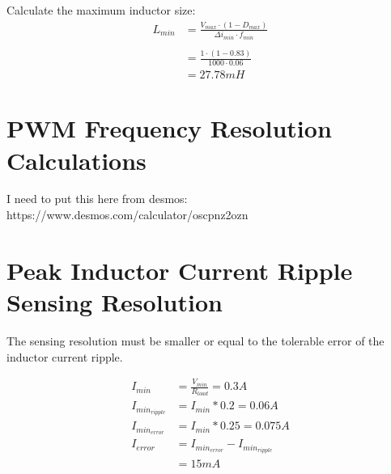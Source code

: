 Calculate the maximum inductor size:
\begin{align}
    L_{min} &= \frac{ V_{max} \cdot \left( 1 - D_{max} \right) } {\Delta i_{min} \cdot f_{min}}\\\nonumber
    \\ \nonumber
    &= \frac{1 \cdot (1 - 0.83)}{1000 \cdot 0.06}\\ \nonumber
    &= 27.78mH
\end{align}


\section*{PWM Frequency Resolution Calculations}

I need to put this here from desmos: https://www.desmos.com/calculator/oscpnz2ozn


\section*{Peak Inductor Current Ripple Sensing Resolution}

The sensing resolution must be smaller or equal to the tolerable error of the inductor current ripple.

\begin{align}
    I_{min} &= \frac{V_{min}}{R_{load}} = 0.3A\\
    I_{min_{ripple}} &= I_{min} * 0.2 = 0.06A\\
    I_{min_{error}} &= I_{min} * 0.25 = 0.075A\\
    I_{error} &=  I_{min_{error}} - I_{min_{ripple}}\\ \nonumber
    &= 15mA
\end{align}

